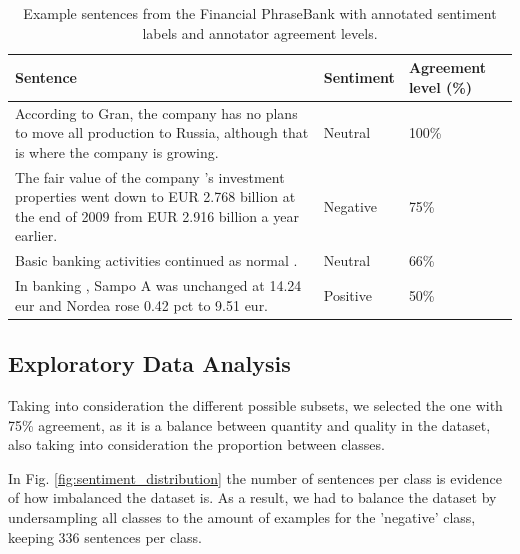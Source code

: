 \documentclass[conference]{IEEEtran}
\begin{document}



\begin{table}[ht]
\centering
\caption{Example sentences from the Financial PhraseBank with annotated sentiment labels and annotator agreement levels.}
\label{tab:fpb_examples}
\begin{tabular}{p{4.0cm}p{1.8cm}p{1.5cm}}
\toprule
\textbf{Sentence} & \textbf{Sentiment} & \textbf{Agreement level (\%)} \\
\midrule
According to Gran, the company has no plans to move all production to Russia, although that is where the company is growing. & Neutral & 100\% \\
The fair value of the company 's investment properties went down to EUR 2.768 billion at the end of 2009 from EUR 2.916 billion a year earlier. & Negative & 75\% \\
Basic banking activities continued as normal . & Neutral & 66\% \\
In banking , Sampo A was unchanged at 14.24 eur and Nordea rose 0.42 pct to 9.51 eur. & Positive & 50\% \\
\bottomrule
\end{tabular}
\end{table}


\subsection{Exploratory Data Analysis}

Taking into consideration the different possible subsets, we selected the one with 75\% agreement, as it is a balance between quantity and quality in the dataset, also taking into consideration the proportion between classes.

In Fig. \ref{fig:sentiment_distribution} the number of sentences per class is evidence of how imbalanced the dataset is. As a result, we had to balance the dataset by undersampling all classes to the amount of examples for the 'negative' class, keeping 336 sentences per class.

\end{document}
